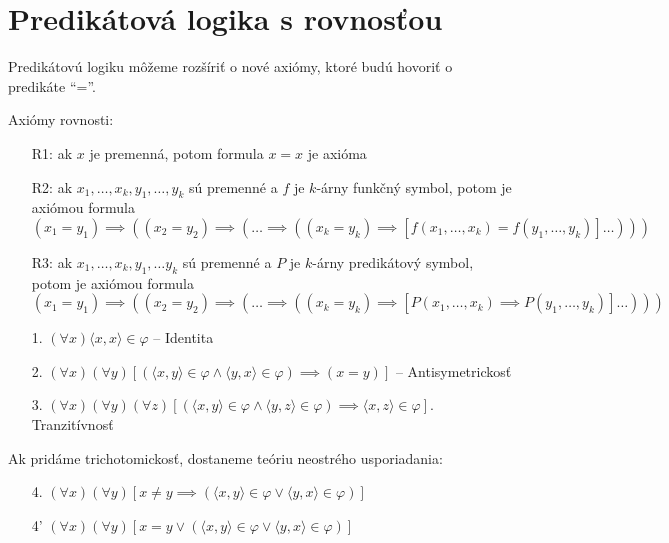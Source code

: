 \section{Predikátová logika s rovnosťou}

Predikátovú logiku môžeme rozšíriť o nové axiómy, ktoré budú
hovoriť o predikáte ``=''.

\par{Axiómy rovnosti:}
\noindent
\begin{itemize}
    \item[R1:] ak $x$ je premenná, potom formula $x=x$ je axióma
    \item[R2:] ak $x_1,\dots,x_k, y_1, \dots, y_k$ sú premenné a 
        $f$ je $k$-árny funkčný symbol, potom je axiómou formula
        \begin{equation*}
            (x_1 = y_1) \implies ( (x_2 = y_2) \implies ( \dots
                \implies ((x_k = y_k) \implies
                    [f(x_1,\dots,x_k) = f(y_1,\dots,y_k)] \dots )))
        \end{equation*}
    \item[R3:] ak $x_1,\dots,x_k, y_1, \dots y_k$ sú premenné a 
        $P$ je $k$-árny predikátový symbol, potom je axiómou formula
        \begin{equation*}
            (x_1 = y_1) \implies ( (x_2 = y_2) \implies ( \dots
                \implies ((x_k = y_k) \implies
                    [P(x_1,\dots,x_k) \implies P(y_1,\dots,y_k)] \dots )))
        \end{equation*}
\end{itemize}

\begin{priklad}
\noindent
    \begin{itemize}
        \item[1.] $(\forall x) \langle x,x\rangle \in \varphi$ -- Identita

        \item[2.] $(\forall x) (\forall y) [
            (\langle x,y \rangle \in \varphi \land
             \langle y,x \rangle \in \varphi) \implies (x=y)]$ -- 
             Antisymetrickosť

        \item[3.] $(\forall x) (\forall y) (\forall z)
            [( \langle x,y \rangle \in \varphi \land 
               \langle y,z \rangle \in \varphi) \implies
               \langle x,z \rangle \in \varphi]$. Tranzitívnosť
    \end{itemize}
    Ak pridáme trichotomickosť, dostaneme teóriu neostrého
    usporiadania:
    \begin{itemize}
        \item[4.] $(\forall x) (\forall y) [x \not=y \implies
            (\langle x,y \rangle \in \varphi \lor 
             \langle y,x \rangle \in \varphi)]$

        \item[4'] $(\forall x) (\forall y) [x = y \lor
            (\langle x,y \rangle \in \varphi \lor 
             \langle y,x \rangle \in \varphi)]$
    \end{itemize}
\end{priklad}

